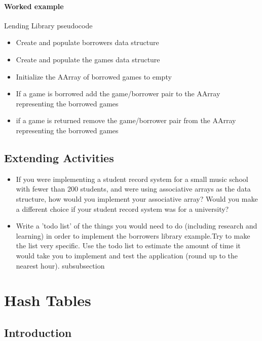 \subsubsection{Worked example}

Lending Library pseudocode
\begin{itemize}
	\item Create and populate borrowers data structure
	\item Create and populate the games data structure
	\item Initialize the AArray  of borrowed games to empty
	\item If a game is borrowed add the game/borrower pair to the AArray representing the borrowed games
	\item if a game is returned remove the game/borrower pair from the AArray representing the borrowed games
\end{itemize}


\section{Extending Activities}
\begin{itemize}

\item {
If you were implementing a student record system for a small music  school with fewer than 200 students, and were using associative arrays as the data structure, how would you implement your associative array? Would you make a different choice if your student record system was for a university?

}

\item {
Write a 'todo list' of the things you would need to do (including research and learning) in order to implement the borrowers library example.Try to make the list very specific. Use the todo list to estimate the amount of time it would take you to implement and test the application (round up to the nearest hour).
subsubsection

}

\end{itemize}
\chapter{Hash Tables} \label{hash}
\section{Introduction}
 
